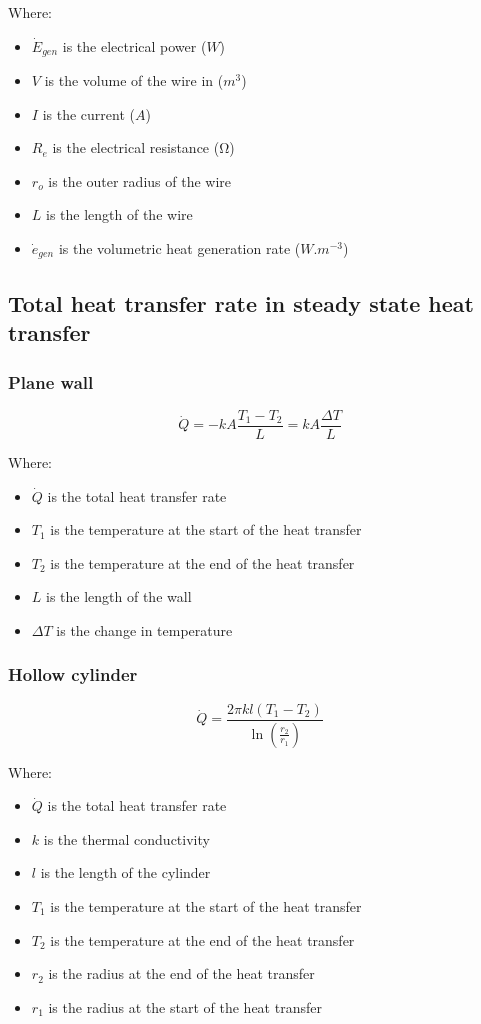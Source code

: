 \documentclass[11pt]{article}
\begin{document}
Where:
\begin{itemize}
\item \(\dot{E}_{gen}\) is the electrical power (\(\unit{W}\))
\item \(V\) is the volume of the wire in (\(\unit{m^3}\))
\item \(I\) is the current (\(\unit{A}\))
\item \(R_e\) is the electrical resistance (\(\unit{\ohm}\))
\item \(r_o\) is the outer radius of the wire
\item \(L\) is the length of the wire
\item \(\dot{e}_{gen}\) is the volumetric heat generation rate (\(\unit{W.m^{-3}}\))
\end{itemize}
\subsection{Total heat transfer rate in steady state heat transfer}
\label{sec:org36dd6e0}

\subsubsection{Plane wall}
\label{sec:org6989cb0}
\[\dot{Q} = -kA \frac{T_1 - T_2}{L} = kA \frac{\Delta T}{L}\]

Where:
\begin{itemize}
\item \(\dot{Q}\) is the total heat transfer rate
\item \(T_1\) is the temperature at the start of the heat transfer
\item \(T_2\) is the temperature at the end of the heat transfer
\item \(L\) is the length of the wall
\item \(\Delta T\) is the change in temperature
\end{itemize}
\subsubsection{Hollow cylinder}
\label{sec:org2c98a41}
\[\dot{Q} = \frac{2 \pi kl (T_1 - T_2)}{\ln \left(\frac{r_2}{r_1} \right)}\]

Where:
\begin{itemize}
\item \(\dot{Q}\) is the total heat transfer rate
\item \(k\) is the thermal conductivity
\item \(l\) is the length of the cylinder
\item \(T_1\) is the temperature at the start of the heat transfer
\item \(T_2\) is the temperature at the end of the heat transfer
\item \(r_2\) is the radius at the end of the heat transfer
\item \(r_1\) is the radius at the start of the heat transfer
\end{itemize}
\end{document}
